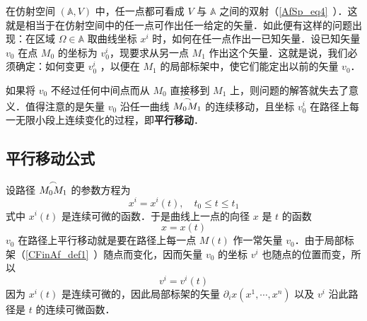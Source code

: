 
在仿射空间 $(\mathbb A,V)$ 中，任一点都可看成 $V$ 与 $\mathbb A$ 之间的双射（\autoref{AfSp_eq4}~）．这就是相当于在仿射空间中的任一点可作出任一给定的矢量．如此便有这样的问题出现：在区域 $\Omega\in\mathbb A$ 取曲线坐标 $x^i$ 时，如何在任一点作出一已知矢量．设已知矢量 $v_0$ 在点 $M_0$ 的坐标为 $v_0^i$，现要求从另一点 $M_1$ 作出这个矢量．这就是说，我们必须确定：如何变更 $v_0^i$ ，以便在 $M_1$ 的局部标架中，使它们能定出以前的矢量 $v_0$．

如果将 $v_0$ 不经过任何中间点而从 $M_0$ 直接移到 $M_1$ 上，则问题的解答就失去了意义．值得注意的是矢量 $v_0$ 沿任一曲线 $\overset{\Huge\frown}{M_0M_1}$ 的连续移动，且坐标 $v_0^i$ 在路径上每一无限小段上连续变化的过程，即\textbf{平行移动}．
\subsection{平行移动公式}
设路径 $\overset{\Huge\frown}{M_0M_1}$ 的参数方程为
\begin{equation}
x^i=x^i(t),\quad t_0\leq t\leq t_1
\end{equation}
式中 $x^i(t)$ 是连续可微的函数．于是曲线上一点的向径 $x$ 是 $t$ 的函数
\begin{equation}
x=x(t)
\end{equation}
$v_0$ 在路径上平行移动就是要在路径上每一点 $M(t)$ 作一常矢量 $v_0$．由于局部标架（\autoref{CFinAf_def1}~）随点而变化，因而矢量 $v_0$ 的坐标 $v^i$ 也随点的位置而变，所以
\begin{equation}
v^i=v^i(t)
\end{equation}
因为 $x^i(t)$ 是连续可微的，因此局部标架的矢量 $\partial_i x(x^1,\cdots,x^n)$ 以及 $v^i$ 沿此路径是 $t$ 的连续可微函数．

